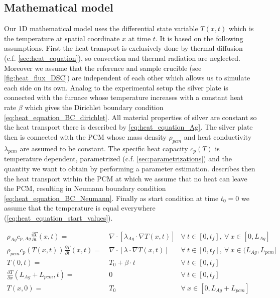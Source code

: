 \documentclass{scrartcl}[12pt, halfparskip]
\numberwithin{equation}{section}
\numberwithin{figure}{section}
\numberwithin{table}{section}
\begin{document}
\subsection{Mathematical model}
\label{sec:mathematical_model}

Our 1D mathematical model uses the differential state variable $T(x,t)$ which is the temperature at spatial coordinate $x$ at time $t$. It is based on the following assumptions. First the heat transport is exclusively done by thermal diffusion (c.f. \cref{sec:heat_equation}), so convection and thermal radiation are neglected. 
Moreover we assume that the reference and sample crucible (see \cref{fig:heat_flux_DSC}) are independent of each other which allows us to simulate each side on its own. 
Analog to the experimental setup the silver plate is connected with the furnace whose temperature increases with a constant heat rate $\beta$ which gives the Dirichlet boundary condition \cref{eq:heat_equation_BC_dirichlet}. All material properties of silver are constant so the heat transport there is described by \cref{eq:heat_equation_Ag}. The silver plate then is connected with the PCM whose mass density $\rho_{pcm}$ and heat conductivity $\lambda_{pcm}$ are assumed to be constant. The specific heat capacity $c_p(T)$ is temperature dependent, parametrized (c.f. \cref{sec:parametrizations}) and the quantity we want to obtain by performing a parameter estimation.  describes then the heat transport within the PCM at which we assume that no heat can leave the PCM, resulting in Neumann boundary condition \cref{eq:heat_equation_BC_Neumann}. Finally as start condition at time ${t_0 = 0}$ we assume that the temperature is equal everywhere (\cref{eq:heat_equation_start_values}).

\begin{subequations}
	\begin{align}
	\rho_{Ag} c_{p,Ag} \frac{\partial T}{\partial t}(x,t) = \ & \nabla \cdot \left[\lambda_{Ag} \cdot \nabla T(x,t)  \right] & \forall \ t \in [0,t_f], \ \forall \ x \in [0,L_{Ag}] \label{eq:heat_equation_Ag} \\
	\rho_{pcm} c_p(T(x,t)) \frac{\partial T}{\partial t}(x,t) = \ & \nabla \cdot \left[\lambda \cdot \nabla T(x,t)  \right]  & \forall \ t \in [0,t_f], \ \forall \ x \in (L_{Ag},L_{pcm}] \label{eq:heat_equation_PCM}  \\
	T(0,t) = \ & T_0 + \beta \cdot t & \forall \ t \in [0,t_f] \label{eq:heat_equation_BC_dirichlet} \\
	\frac{\partial T}{\partial x} (L_{Ag} + L_{pcm},t) = \ & 0 & \forall \ t \in [0,t_f] \label{eq:heat_equation_BC_Neumann}  \\
	T(x,0) = \ & T_0 & \forall \ x \in [0,L_{Ag} + L_{pcm}] \label{eq:heat_equation_start_values} 
	\end{align}
	\label{eq:heat_equation_model}
\end{subequations}
\end{document}
